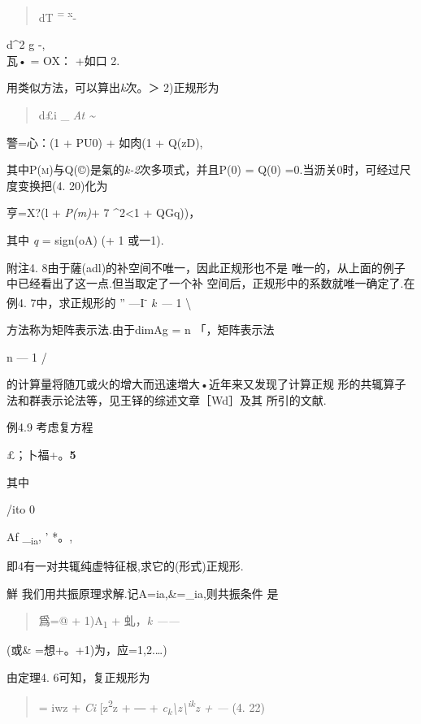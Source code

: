 \documentclass{article}
\begin{document}
\begin{quote}
dT \textsuperscript{= x}-
\end{quote}

d\^{}2 g -,\\
瓦• = OX： +如口 2.

用类似方法，可以算出\emph{k}次。＞ 2)正规形为

\begin{quote}
d£i \_ \emph{At \textasciitilde{}}
\end{quote}

警=心：(1 + PU0) + 如肉(1 + Q(zD),

其中\textsc{P(m)}与Q(©)是氣的\emph{k-2}次多项式，并且P(0) = Q(0)
=0.当沥关0时，可经过尺度变换把(4. 20)化为

亨=X?(l + \emph{P(m)}+ 7 \^{}2\textless{}1 + QGq))，

其中 \emph{q} = sign(oA) (+ 1 或一1).

附注4. 8由于薩(adl)的补空间不唯一，因此正规形也不是
唯一的，从上面的例子中已经看出了这一点.但当取定了一个补
空间后，正规形中的系数就唯一确定了.在例4. 7中，求正规形的 ''
---I\textsuperscript{-} \emph{k ---} 1 \textbackslash{}

方法称为矩阵表示法.由于dimAg = n 「，矩阵表示法

n --- 1 /

的计算量将随兀或火的增大而迅速増大•近年来又发现了计算正规
形的共辄算子法和群表示论法等，见王铎的综述文章［Wd］及其 所引的文献.

例4.9 考虑复方程

£；卜福+。\textbf{5}

其中

/ito 0

Af \_\textsubscript{ia}, ' *。,

即4有一对共辄纯虚特征根,求它的(形式)正规形.

鮮 我们用共振原理求解.记A=ia,\&=\_ia,则共振条件 是

\begin{quote}
爲=@ + 1)A\textsubscript{1} + 虬，\emph{k ------}
\end{quote}

(或\& =想+。+1)为，应=1,2.\ldots{})

由定理4. 6可知，复正规形为

\begin{quote}
= iwz + \emph{Ci} {[}z\textbar{}\textsuperscript{2}z + ― +
\emph{c\textsubscript{k}\textbackslash{}z\textbackslash{}\textsuperscript{ik}z
+ ---} (4. 22)
\end{quote}
\end{document}
